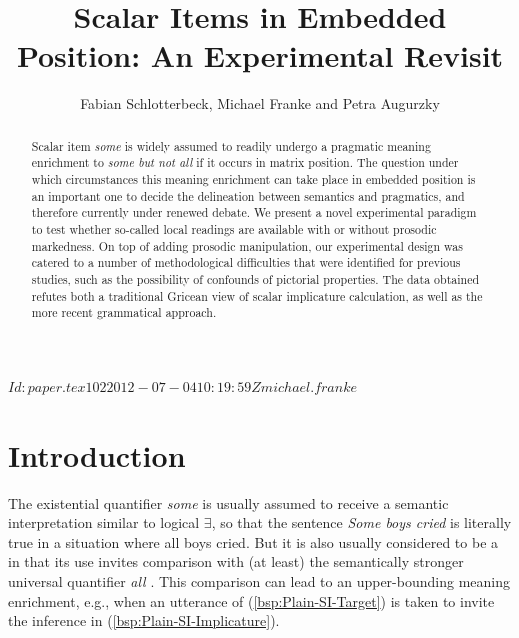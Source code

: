 \documentclass[fleqn,reqno,10pt,draft]{article}
\title{Scalar Items in Embedded Position: {A}n Experimental Revisit}
\author{Fabian Schlotterbeck, Michael Franke and Petra Augurzky}
\date{}
\begin{document}
\maketitle



\begin{abstract}
  Scalar item \emph{some} is widely assumed to readily undergo a
  pragmatic meaning enrichment to \emph{some but not all} if it occurs
  in matrix position. The question under which circumstances this
  meaning enrichment can take place in embedded position is an
  important one to decide the delineation between semantics and
  pragmatics, and therefore currently under renewed debate. %
  We present a novel experimental paradigm to test whether so-called
  local readings are available with or without prosodic markedness. On
  top of adding prosodic manipulation, our experimental design was
  catered to a number of methodological difficulties that were
  identified for previous studies, such as the possibility of
  confounds of pictorial properties. The data obtained refutes both a
  traditional Gricean view of scalar implicature calculation, as well
  as the more recent grammatical approach.
\end{abstract}

\tableofcontents

\svnInfo $Id: paper.tex 102 2012-07-04 10:19:59Z michael.franke $

\section{Introduction}
\label{sec:introduction}

The existential quantifier \emph{some} is usually assumed to receive a
semantic interpretation similar to logical $\exists$, so that the
sentence \emph{Some boys cried} is literally true in a situation where
all boys cried. But it is also usually considered to be a
 in that its use invites comparison with (at
least) the semantically stronger universal quantifier \emph{all}
\citep[c.f.][]{Horn1972:On-the-Semantic,Gazdar1979:Pragmatics:-Imp,AtlasLevinson1981}. This
comparison can lead to an upper-bounding meaning enrichment, e.g.,
when an utterance of (\ref{bsp:Plain-SI-Target}) is taken to invite
the inference in (\ref{bsp:Plain-SI-Implicature}).
\end{document}
